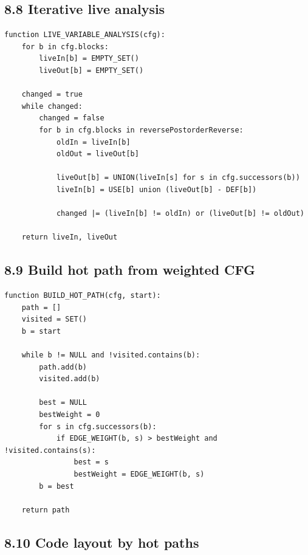 \documentclass[10pt,letterpaper]{article}
\begin{document}
\subsection*{8.8 Iterative live analysis}
{}

\begin{verbatim}
function LIVE_VARIABLE_ANALYSIS(cfg):
    for b in cfg.blocks:
        liveIn[b] = EMPTY_SET()
        liveOut[b] = EMPTY_SET()

    changed = true
    while changed:
        changed = false
        for b in cfg.blocks in reversePostorderReverse:
            oldIn = liveIn[b]
            oldOut = liveOut[b]

            liveOut[b] = UNION(liveIn[s] for s in cfg.successors(b))
            liveIn[b] = USE[b] union (liveOut[b] - DEF[b])

            changed |= (liveIn[b] != oldIn) or (liveOut[b] != oldOut)

    return liveIn, liveOut
\end{verbatim}

\subsection*{8.9 Build hot path from weighted CFG}
{}

\begin{verbatim}
function BUILD_HOT_PATH(cfg, start):
    path = []
    visited = SET()
    b = start

    while b != NULL and !visited.contains(b):
        path.add(b)
        visited.add(b)

        best = NULL
        bestWeight = 0
        for s in cfg.successors(b):
            if EDGE_WEIGHT(b, s) > bestWeight and !visited.contains(s):
                best = s
                bestWeight = EDGE_WEIGHT(b, s)
        b = best

    return path
\end{verbatim}

\subsection*{8.10 Code layout by hot paths}
{}
\end{document}
